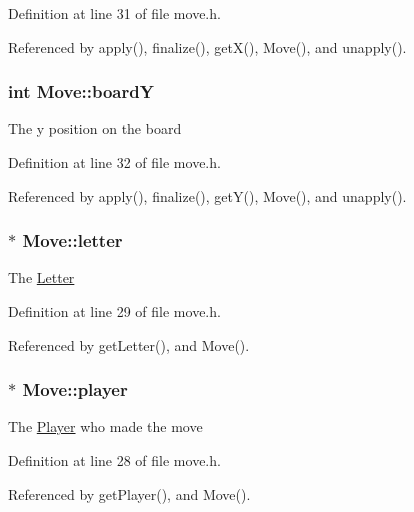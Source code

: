 Definition at line 31 of file move.\-h.



Referenced by apply(), finalize(), get\-X(), Move(), and unapply().

\hypertarget{class_move_ac953ac3b9b8ca529d1be967c7712ae05}{
\subsubsection[{board\-Y}]{\setlength{\rightskip}{0pt plus 5cm}int Move\-::board\-Y\hspace{0.3cm}{\ttfamily [private]}}}\label{class_move_ac953ac3b9b8ca529d1be967c7712ae05}
The y position on the board 

Definition at line 32 of file move.\-h.



Referenced by apply(), finalize(), get\-Y(), Move(), and unapply().

\hypertarget{class_move_a80fe73cecfae0270265a8d5a50a9739f}{
\subsubsection[{letter}]{$\ast$ Move\-::letter\hspace{0.3cm}{\ttfamily [private]}}}\label{class_move_a80fe73cecfae0270265a8d5a50a9739f}
The \hyperlink{class_letter}{Letter} 

Definition at line 29 of file move.\-h.



Referenced by get\-Letter(), and Move().

\hypertarget{class_move_a1fbc388e091cd5639b755ebca2a8f90b}{
\subsubsection[{player}]{$\ast$ Move\-::player\hspace{0.3cm}{\ttfamily [private]}}}\label{class_move_a1fbc388e091cd5639b755ebca2a8f90b}
The \hyperlink{class_player}{Player} who made the move 

Definition at line 28 of file move.\-h.



Referenced by get\-Player(), and Move().

